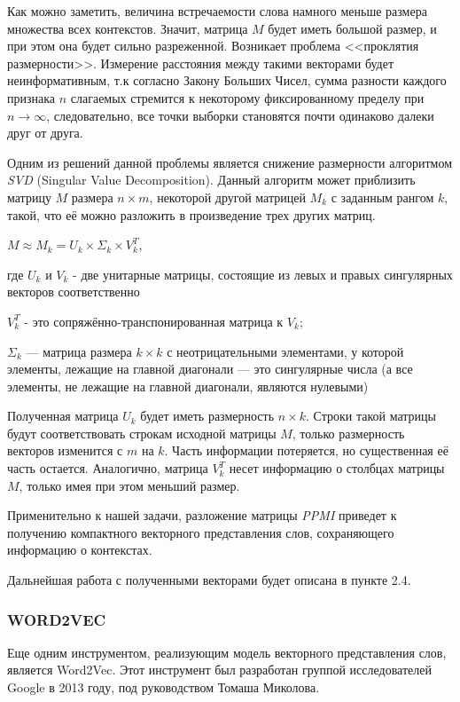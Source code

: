 Как можно заметить, величина встречаемости слова намного меньше размера множества
всех контекстов. Значит, матрица $M$ будет иметь большой размер, и при этом она будет
сильно разреженной. Возникает проблема <<проклятия размерности>>. 
Измерение
расстояния между такими векторами будет неинформативным, т.к согласно Закону
Больших Чисел, сумма разности каждого признака $n$ слагаемых стремится к некоторому фиксированному пределу при $n \to \infty$, следовательно, все точки
выборки становятся почти одинаково далеки друг от друга.

Одним из решений данной проблемы является снижение размерности алгоритмом \textit{SVD}
(Singular Value Decomposition). Данный алгоритм может приблизить матрицу $M$ размера $n \times m$, некоторой другой матрицей $M_k$ с заданным рангом $k$, такой, что её можно разложить в
произведение трех других матриц.

$M \approx M_k = U_k \times \Sigma_k \times V^T_k$,

где $U_k$ и $V_k$ - две унитарные матрицы, состоящие из левых и правых сингулярных
векторов соответственно

$V^T_k$ - это сопряжённо-транспонированная матрица к $V_k$;

$\Sigma_k$ — матрица размера $k \times k$ с неотрицательными элементами, у которой элементы,
лежащие на главной диагонали — это сингулярные числа (а все элементы, не лежащие на
главной диагонали, являются нулевыми)

Полученная матрица $U_k$ будет иметь размерность $n \times k$. Строки такой матрицы будут
соответствовать строкам исходной матрицы $M$, только размерность векторов изменится с
$m$ на $k$. Часть информации потеряется, но существенная её часть остается. Аналогично,
матрица $V^T_k$ несет информацию о столбцах матрицы $M$, только имея при этом меньший
размер.

Применительно к нашей задачи, разложение матрицы \textit{PPMI} приведет к получению
компактного векторного представления слов, сохраняющего информацию о контекстах.

Дальнейшая работа с полученными векторами будет описана в пункте 2.4.


\subsubsection{WORD2VEC}

Еще одним инструментом, реализующим модель векторного представления слов, является
Word2Vec. Этот инструмент был разработан группой исследователей Google в 2013 году,
под руководством Томаша Миколова.

